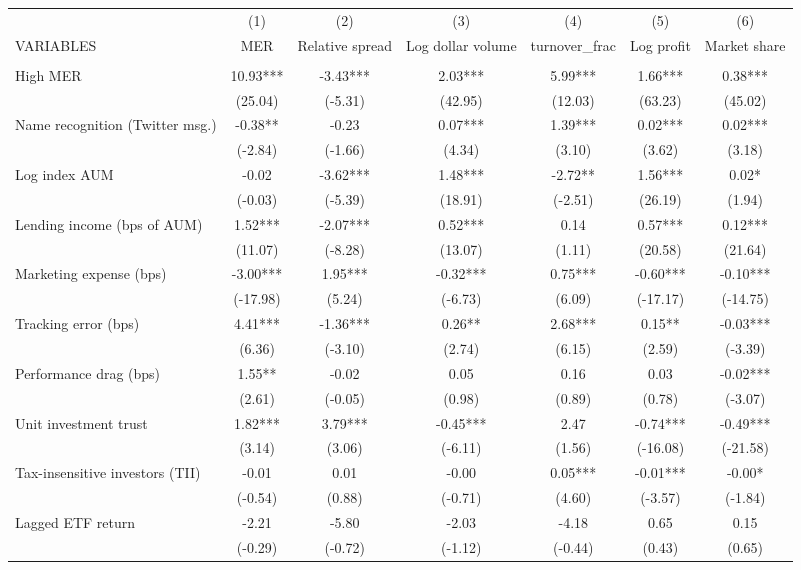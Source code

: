 \documentclass[]{article}
\begin{document}
\begin{tabular}{lcccccc} \hline
 & (1) & (2) & (3) & (4) & (5) & (6) \\
VARIABLES & MER & Relative spread & Log dollar volume & turnover\_frac & Log profit & Market share \\ \hline
 &  &  &  &  &  &  \\
High MER & 10.93*** & -3.43*** & 2.03*** & 5.99*** & 1.66*** & 0.38*** \\
 & (25.04) & (-5.31) & (42.95) & (12.03) & (63.23) & (45.02) \\
Name recognition (Twitter msg.) & -0.38** & -0.23 & 0.07*** & 1.39*** & 0.02*** & 0.02*** \\
 & (-2.84) & (-1.66) & (4.34) & (3.10) & (3.62) & (3.18) \\
Log index AUM & -0.02 & -3.62*** & 1.48*** & -2.72** & 1.56*** & 0.02* \\
 & (-0.03) & (-5.39) & (18.91) & (-2.51) & (26.19) & (1.94) \\
Lending income (bps of AUM) & 1.52*** & -2.07*** & 0.52*** & 0.14 & 0.57*** & 0.12*** \\
 & (11.07) & (-8.28) & (13.07) & (1.11) & (20.58) & (21.64) \\
Marketing expense (bps) & -3.00*** & 1.95*** & -0.32*** & 0.75*** & -0.60*** & -0.10*** \\
 & (-17.98) & (5.24) & (-6.73) & (6.09) & (-17.17) & (-14.75) \\
Tracking error (bps) & 4.41*** & -1.36*** & 0.26** & 2.68*** & 0.15** & -0.03*** \\
 & (6.36) & (-3.10) & (2.74) & (6.15) & (2.59) & (-3.39) \\
Performance drag (bps) & 1.55** & -0.02 & 0.05 & 0.16 & 0.03 & -0.02*** \\
 & (2.61) & (-0.05) & (0.98) & (0.89) & (0.78) & (-3.07) \\
Unit investment trust & 1.82*** & 3.79*** & -0.45*** & 2.47 & -0.74*** & -0.49*** \\
 & (3.14) & (3.06) & (-6.11) & (1.56) & (-16.08) & (-21.58) \\
Tax-insensitive investors (TII) & -0.01 & 0.01 & -0.00 & 0.05*** & -0.01*** & -0.00* \\
 & (-0.54) & (0.88) & (-0.71) & (4.60) & (-3.57) & (-1.84) \\
Lagged ETF return & -2.21 & -5.80 & -2.03 & -4.18 & 0.65 & 0.15 \\
 & (-0.29) & (-0.72) & (-1.12) & (-0.44) & (0.43) & (0.65) \\

\end{tabular}
\end{document}
